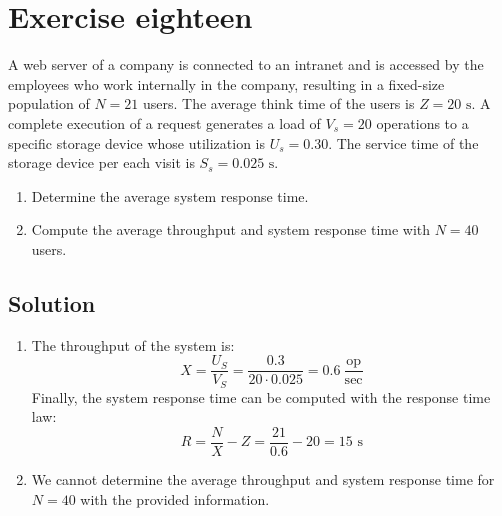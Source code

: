 \section{Exercise eighteen}

A web server of a company is connected to an intranet and is accessed by the employees who work internally in the company, resulting in a fixed-size population of $N=21$ users.
The average think time of the users is $Z=20\text{ s}$. 
A complete execution of a request generates a load of $V_s=20$ operations to a specific storage device whose utilization is $U_s = 0.30$. 
The service time of the storage device per each visit is $S_s = 0.025\text{ s}$.
\begin{enumerate}
    \item Determine the average system response time.
    \item Compute the average throughput and system response time with $N=40$ users.
\end{enumerate}

\subsection*{Solution}
\begin{enumerate}
    \item The throughput of the system is:
        \[X=\dfrac{U_S}{V_S}=\dfrac{0.3}{20\cdot 0.025}=0.6\:\dfrac{\text{op}}{{\text{sec}}}\]
        Finally, the system response time can be computed with the response time law:
        \[R=\dfrac{N}{X}-Z=\dfrac{21}{0.6}-20=15\text{ s}\]
    \item We cannot determine the average throughput and system response time for $N=40$ with the provided information.
\end{enumerate}